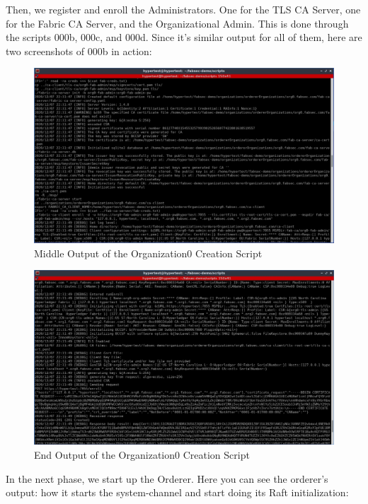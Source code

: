 	\newpage
	\hspace{10mm}Then, we register and enroll the Administrators. One for the TLS CA Server, one for the Fabric CA Server, and the Organizational Admin. This is done through the scripts 000b, 000c, and 000d. Since it's similar output for all of them, here are two screenshots of 000b in action:
	
		\begin{figure}[H]
		\includegraphics[width=.8\textwidth]{./fabsec-report-network-flow/network-flow-3.jpg}
		\centering
		\caption{Middle Output of the Organization0 Creation Script}
		\end{figure}
		
		\begin{figure}[H]
		\includegraphics[width=.8\textwidth]{./fabsec-report-network-flow/network-flow-4.jpg}
		\centering
		\caption{End Output of the Organization0 Creation Script}
		\end{figure}
		
	\newpage
	\hspace{10mm}In the next phase, we start up the Orderer. Here you can see the orderer's output: how it starts the system-channel and start doing its Raft initialization:
	
